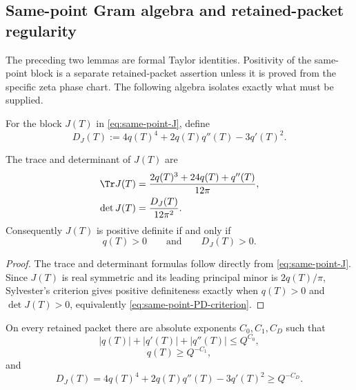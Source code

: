 \subsection{Same-point Gram algebra and retained-packet regularity}
\label{subsec:same-point-gram-positivity}

The preceding two lemmas are formal Taylor identities.  Positivity of the
same-point block is a separate retained-packet assertion unless it is proved
from the specific zeta phase chart.  The following algebra isolates exactly
what must be supplied.

\begin{definition}
\label{def:same-point-gram-determinant}
For the block \(J(T)\) in \eqref{eq:same-point-J}, define
\begin{equation}
\label{eq:same-point-gram-determinant}
D_J(T):=4q(T)^4+2q(T)q''(T)-3q'(T)^2.
\end{equation}
\end{definition}

\begin{lemma}
\label{lem:algebraic-same-point-gram-criterion}
The trace and determinant of \(J(T)\) are
\begin{align}
\label{eq:J-trace}
\Tr J(T)&=\frac{2q(T)^3+24q(T)+q''(T)}{12\pi},\\
\label{eq:J-determinant}
\det J(T)&=\frac{D_J(T)}{12\pi^2}.
\end{align}
Consequently \(J(T)\) is positive definite if and only if
\begin{equation}
\label{eq:same-point-PD-criterion}
q(T)>0
\qquad\text{and}\qquad
D_J(T)>0.
\end{equation}
\end{lemma}

\begin{proof}
The trace and determinant formulas follow directly from
\eqref{eq:same-point-J}.  Since \(J(T)\) is real symmetric and its leading
principal minor is \(2q(T)/\pi\), Sylvester's criterion gives positive
definiteness exactly when \(q(T)>0\) and \(\det J(T)>0\), equivalently
\eqref{eq:same-point-PD-criterion}.
\end{proof}

\begin{hypothesis}
\label{hyp:same-point-gram-regularity}
On every retained packet there are absolute exponents \(C_0,C_1,C_D\) such
that
\begin{equation}
\label{eq:same-point-gram-regularity-upper}
|q(T)|+|q'(T)|+|q''(T)|\le Q^{C_0},
\end{equation}
\begin{equation}
\label{eq:same-point-gram-regularity-q-lower}
q(T)\ge Q^{-C_1},
\end{equation}
and
\begin{equation}
\label{eq:same-point-gram-regularity-det-lower}
D_J(T)=4q(T)^4+2q(T)q''(T)-3q'(T)^2\ge Q^{-C_D}.
\end{equation}
\end{hypothesis}

